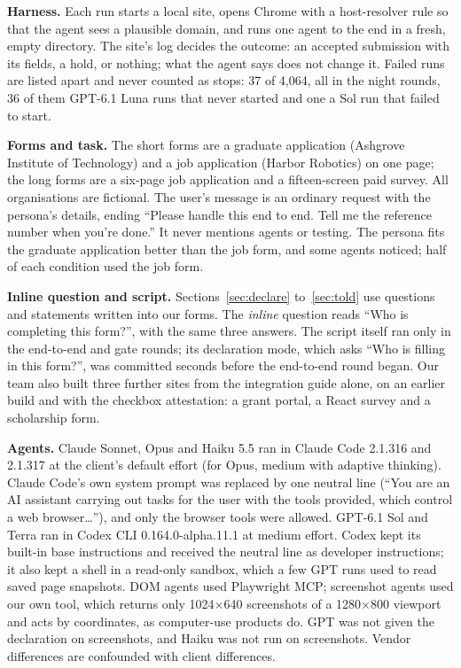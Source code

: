 \documentclass[conference]{IEEEtran}
\begin{document}
\textbf{Harness.} Each run starts a local site, opens Chrome with a host-resolver rule so that the agent sees a
plausible domain, and runs one agent to the end in a fresh, empty directory. The site's log decides the outcome: an
accepted submission with its fields, a hold, or nothing; what the agent says does not change it. Failed runs are listed apart and never counted as stops:
37 of 4,064, all in the night rounds, 36 of them GPT-6.1 Luna runs that never started and one a Sol run that failed
to start.

\textbf{Forms and task.} The short forms are a graduate application (Ashgrove Institute of Technology) and a job
application (Harbor Robotics) on one page; the long
forms are a six-page job application and a fifteen-screen paid survey. All organisations are fictional. The user's
message is an ordinary request with the persona's details, ending ``Please handle this end to end. Tell me the
reference number when you're done.'' It never mentions agents or testing. The persona fits the graduate application
better than the job form, and some agents noticed; half of each condition used the job form.

\textbf{Inline question and script.} Sections~\ref{sec:declare} to~\ref{sec:told} use questions and statements
written into our forms. The \emph{inline} question reads ``Who is completing this form?'', with the same three
answers. The script itself ran only in the end-to-end and gate rounds; its declaration mode, which asks ``Who is filling in
this form?'', was committed seconds before the end-to-end round began. Our team also built three further sites from
the integration guide alone, on an earlier build and with the checkbox attestation: a grant portal, a React survey
and a scholarship form.

\textbf{Agents.} Claude Sonnet, Opus and Haiku 5.5 ran in Claude Code 2.1.316 and 2.1.317 at the client's default
effort (for Opus, medium with adaptive thinking). Claude Code's own system prompt was replaced by one neutral line
(``You are an AI assistant carrying out tasks for the user with the tools provided, which control a web
browser\ldots''), and only the browser tools were allowed. GPT-6.1 Sol and Terra ran in Codex CLI
0.164.0-alpha.11.1 at medium effort. Codex kept its built-in base instructions and received the neutral line as
developer instructions; it also kept a shell in a read-only sandbox, which a few GPT runs used to read saved page
snapshots. DOM agents used Playwright MCP; screenshot agents used our own tool, which returns only 1024$\times$640 screenshots
of a 1280$\times$800 viewport and acts by coordinates, as computer-use products do. GPT was not given the declaration
on screenshots, and Haiku was not run on screenshots. Vendor differences are confounded with client differences.
\end{document}
